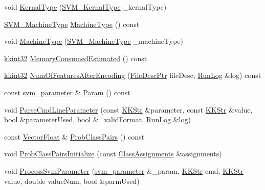 \begin{DoxyCompactItemize}
void \hyperlink{class_k_k_m_l_l_1_1_s_v_mparam_a1e7084816c58984309e2325aeaf97116}{Kernal\+Type} (\hyperlink{namespace_k_k_m_l_l_a14bbc982261fe6adeaf682c543ef9569}{S\+V\+M\+\_\+\+Kernal\+Type} \+\_\+kernal\+Type)
\item 
\hyperlink{namespace_k_k_m_l_l_ad917464bc631109a3021cf02cd27af9a}{S\+V\+M\+\_\+\+Machine\+Type} \hyperlink{class_k_k_m_l_l_1_1_s_v_mparam_a30153e00007f9cf65343e0ad97ad61fb}{Machine\+Type} () const 
\item 
void \hyperlink{class_k_k_m_l_l_1_1_s_v_mparam_a48190c955c4c0d944b7eb805a403210d}{Machine\+Type} (\hyperlink{namespace_k_k_m_l_l_ad917464bc631109a3021cf02cd27af9a}{S\+V\+M\+\_\+\+Machine\+Type} \+\_\+machine\+Type)
\item 
\hyperlink{namespace_k_k_b_a8fa4952cc84fda1de4bec1fbdd8d5b1b}{kkint32} \hyperlink{class_k_k_m_l_l_1_1_s_v_mparam_a8338dec54ee6c5cb7b37a6f809913e35}{Memory\+Consumed\+Estimated} () const 
\item 
\hyperlink{namespace_k_k_b_a8fa4952cc84fda1de4bec1fbdd8d5b1b}{kkint32} \hyperlink{class_k_k_m_l_l_1_1_s_v_mparam_a34199d2a821d81f2b6510d67eec25249}{Num\+Of\+Features\+After\+Encoding} (\hyperlink{namespace_k_k_m_l_l_aa0d0b6ab4ec18868a399b8455b05d914}{File\+Desc\+Ptr} file\+Desc, \hyperlink{class_k_k_b_1_1_run_log}{Run\+Log} \&log) const 
\item 
const \hyperlink{struct_s_v_m233_1_1svm__parameter}{svm\+\_\+parameter} \& \hyperlink{class_k_k_m_l_l_1_1_s_v_mparam_a8cfd90d197ffc05e10330d52320f61fe}{Param} () const 
\item 
void \hyperlink{class_k_k_m_l_l_1_1_s_v_mparam_acd0149df04ec777b4ada1e45cea308cb}{Parse\+Cmd\+Line\+Parameter} (const \hyperlink{class_k_k_b_1_1_k_k_str}{K\+K\+Str} \&parameter, const \hyperlink{class_k_k_b_1_1_k_k_str}{K\+K\+Str} \&value, bool \&parameter\+Used, bool \&\+\_\+valid\+Format, \hyperlink{class_k_k_b_1_1_run_log}{Run\+Log} \&log)
\item 
const \hyperlink{namespace_k_k_b_a4820c3670ee1fe74f0c4de981c600faf}{Vector\+Float} \& \hyperlink{class_k_k_m_l_l_1_1_s_v_mparam_a4dace21b93df510f6cdf2d9722edef1a}{Prob\+Class\+Pairs} () const 
\item 
void \hyperlink{class_k_k_m_l_l_1_1_s_v_mparam_a224dcd1bf0f35df058c14318188a56fd}{Prob\+Class\+Pairs\+Initialize} (const \hyperlink{class_k_k_m_l_l_1_1_class_assignments}{Class\+Assignments} \&assignments)
\item 
void \hyperlink{class_k_k_m_l_l_1_1_s_v_mparam_aa5eaf4b4136dac017f59de2e8217bbb7}{Process\+Svm\+Parameter} (\hyperlink{struct_s_v_m233_1_1svm__parameter}{svm\+\_\+parameter} \&\+\_\+param, \hyperlink{class_k_k_b_1_1_k_k_str}{K\+K\+Str} cmd, \hyperlink{class_k_k_b_1_1_k_k_str}{K\+K\+Str} value, double value\+Num, bool \&parm\+Used)

\end{DoxyCompactItemize}
